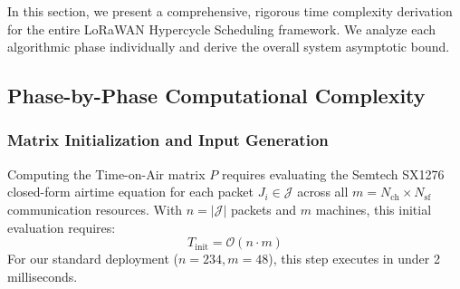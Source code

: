 \documentclass{article}
\begin{document}
In this section, we present a comprehensive, rigorous time complexity derivation for the entire LoRaWAN Hypercycle Scheduling framework. We analyze each algorithmic phase individually and derive the overall system asymptotic bound.

\subsection{Phase-by-Phase Computational Complexity}

\subsubsection{Matrix Initialization and Input Generation}
Computing the Time-on-Air matrix $P$ requires evaluating the Semtech SX1276 closed-form airtime equation for each packet $J_i \in \mathcal{J}$ across all $m = N_{\text{ch}} \times N_{\text{sf}}$ communication resources. With $n = |\mathcal{J}|$ packets and $m$ machines, this initial evaluation requires:
\begin{equation}
T_{\text{init}} = \mathcal{O}(n \cdot m)
\end{equation}
For our standard deployment ($n = 234, m = 48$), this step executes in under 2 milliseconds.
\end{document}
